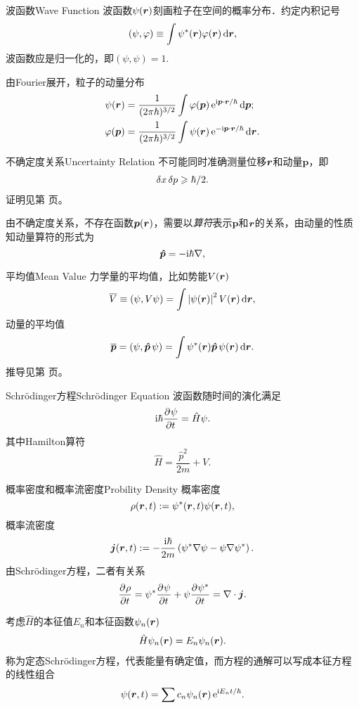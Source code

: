 \begin{definition}{波函数}{Wave Function}
	波函数$\psi(\bm r)$刻画粒子在空间的概率分布．约定内积记号
	\[
		(\psi,\varphi)\equiv\int\psi^*(\bm r)\varphi(\bm r)\mathop{}\!\mathrm{d}\bm r,
	\]	
	波函数应是归一化的，即$(\psi,\psi)=1.$
\end{definition}
由Fourier展开，粒子的动量分布
\begin{align}
	\psi(\bm r)       & =\frac1{(2\pi\hbar)^{3/2}}\int\varphi(\bm p)\mathop{}\!\mathrm{e}^{\mathrm{i}\bm p\cdot\bm r/\hbar}\mathop{}\!\mathrm{d}\bm p; \\
	\varphi(\bm p) & =\frac1{(2\pi\hbar)^{3/2}}\int\psi(\bm r)\mathop{}\!\mathrm{e}^{-\mathrm{i}\bm p\cdot\bm r/\hbar}\mathop{}\!\mathrm{d}\bm r.
\end{align}
\begin{theorem}{不确定度关系}{Uncertainty Relation}
	不可能同时准确测量位移$\bm r$和动量$\bm p$，即
	\begin{align}
		\delta x\mathop{}\!\delta p\geqslant\hbar/2.
	\end{align}
	证明见第 \pageref{Proof of UR} 页。
\end{theorem}
由不确定度关系，不存在函数$\bm p(\bm r)$，需要以\textit{算符}表示$\bm p$和$\bm r$的关系，由动量的性质知动量算符的形式为
\[
	\bm{\hat p}\!\mathop{}=-\mathrm{i}\hbar\nabla,
\]
\begin{definition}{平均值}{Mean Value}
	力学量的平均值，比如势能$V(\bm r)$
	\[
		\overline{V}\equiv(\psi,V\psi)=\int\left\lvert\psi(\bm r)\right\rvert^2V(\bm r)\mathop{}\!\mathrm{d}\bm r,
	\]
	动量的平均值
	\[
		\overline{\bm p}=(\psi,\bm{\hat p}\!\mathop{}\psi)=\int\psi^*(\bm r)\bm{\hat p}\!\mathop{}\psi(\bm r)\mathop{}\!\mathrm{d}\bm r.
	\]
	推导见第 \pageref{Derivation of Mean Value} 页。
\end{definition}
\begin{theorem}{Schrödinger方程}{Schrödinger Equation}
	波函数随时间的演化满足
	\begin{align}
		\mathrm{i}\hbar\frac{\partial^{{}}\psi}{\partial{t}^{{}}}=\hat H\psi.
	\end{align}
	其中Hamilton算符
	\[
		\hat H=\frac{\hat p^2}{2m}+V.
	\] %
\end{theorem}
\begin{definition}{概率密度和概率流密度}{Probility Density}
	概率密度
	\[
		\rho(\bm r,t):=\psi^*(\bm r,t)\psi(\bm r,t),
	\]
	概率流密度
	\[
		\bm j(\bm r,t):=-\frac{\mathrm{i}\hbar}{2m}\left(\psi^*\nabla\psi-\psi\nabla\psi^*\right).
	\]
	由Schrödinger方程，二者有关系
	\[
		\frac{\partial^{{}}\rho}{\partial{t}^{{}}}=\psi^*\frac{\partial^{{}}\psi}{\partial{t}^{{}}}+\psi\frac{\partial^{{}}\psi^*}{\partial{t}^{{}}}=\nabla\cdot\bm j.
	\]
\end{definition}
考虑$\hat H$的本征值$E_n$和本征函数$\psi_n(\bm r)$
\begin{align}
	\hat H\psi_n(\bm r)=E_n\psi_n(\bm r).
\end{align}
称为定态Schrödinger方程，代表能量有确定值，而方程的通解可以写成本征方程的线性组合
\[
	\psi(\bm r,t)=\sum c_n\psi_n(\bm r)\mathop{}\!\mathrm{e}^{\mathrm{i} E_nt/\hbar}.
\]